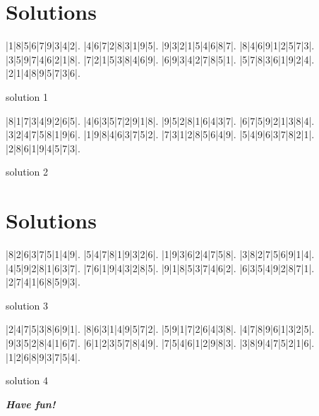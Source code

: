 \documentclass[fontsize=24pt,letterpaper]{scrartcl}
\renewcommand*\sudokuformat[1]{\Large\sffamily#1}
\begin{document}
\clearpage

\section{Solutions}
\setlength\sudokusize{8cm}
\renewcommand*\sudokuformat[1]{\sffamily#1}
\vspace{1cm}
\begin{sudoku}
|1|8|5|6|7|9|3|4|2|.
|4|6|7|2|8|3|1|9|5|.
|9|3|2|1|5|4|6|8|7|.
|8|4|6|9|1|2|5|7|3|.
|3|5|9|7|4|6|2|1|8|.
|7|2|1|5|3|8|4|6|9|.
|6|9|3|4|2|7|8|5|1|.
|5|7|8|3|6|1|9|2|4|.
|2|1|4|8|9|5|7|3|6|.
\end{sudoku}
\begin{center}
    solution 1
\end{center}
\vspace{0.2cm}
\begin{sudoku}
|8|1|7|3|4|9|2|6|5|.
|4|6|3|5|7|2|9|1|8|.
|9|5|2|8|1|6|4|3|7|.
|6|7|5|9|2|1|3|8|4|.
|3|2|4|7|5|8|1|9|6|.
|1|9|8|4|6|3|7|5|2|.
|7|3|1|2|8|5|6|4|9|.
|5|4|9|6|3|7|8|2|1|.
|2|8|6|1|9|4|5|7|3|.
\end{sudoku}
\begin{center}
    solution 2
\end{center}


\clearpage
\section{Solutions}
\vspace{1cm}
\begin{sudoku}
|8|2|6|3|7|5|1|4|9|.
|5|4|7|8|1|9|3|2|6|.
|1|9|3|6|2|4|7|5|8|.
|3|8|2|7|5|6|9|1|4|.
|4|5|9|2|8|1|6|3|7|.
|7|6|1|9|4|3|2|8|5|.
|9|1|8|5|3|7|4|6|2|.
|6|3|5|4|9|2|8|7|1|.
|2|7|4|1|6|8|5|9|3|.
\end{sudoku}
\begin{center}
    solution 3
\end{center}
\begin{sudoku}
|2|4|7|5|3|8|6|9|1|.
|8|6|3|1|4|9|5|7|2|.
|5|9|1|7|2|6|4|3|8|.
|4|7|8|9|6|1|3|2|5|.
|9|3|5|2|8|4|1|6|7|.
|6|1|2|3|5|7|8|4|9|.
|7|5|4|6|1|2|9|8|3|.
|3|8|9|4|7|5|2|1|6|.
|1|2|6|8|9|3|7|5|4|.
\end{sudoku}
\begin{center}
    solution 4
\end{center}
\clearpage

{\centering\Huge\itshape\bfseries Have fun!\par}
\end{document}
